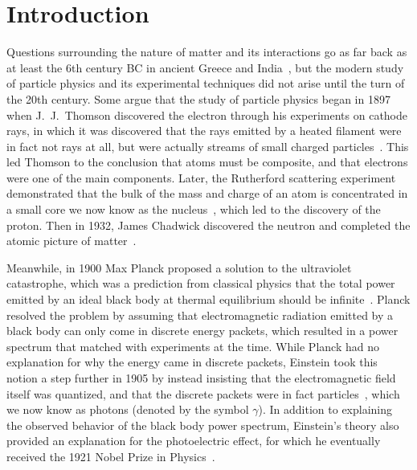 
\chapter{Introduction}
\label{chap:intro}

Questions surrounding the nature of matter and its interactions go as far back as at least the 6th century BC in ancient Greece and India~\cite{PhysNuclphys196p}, but the modern study of particle physics and its experimental techniques did not arise until the turn of the 20th century. %
Some argue that the study of particle physics began in 1897 when J.\ J.\ Thomson discovered the electron through his experiments on cathode rays, in which it was discovered that the rays emitted by a heated filament were in fact not rays at all, but were actually streams of small charged particles~\cite{doi:10.1080/14786449708621070}.
This led Thomson to the conclusion that atoms must be composite, and that electrons were one of the main components.
Later, the Rutherford scattering experiment demonstrated that the bulk of the mass and charge of an atom is concentrated in a small core we now know as the nucleus~\cite{BargerCollider}, which led to the discovery of the proton.
Then in 1932, James Chadwick discovered the neutron and completed the atomic picture of matter~\cite{weinberg2003discovery}.

Meanwhile, in 1900 Max Planck proposed a solution to the ultraviolet catastrophe, which was a prediction from classical physics that the total power emitted by an ideal black body at thermal equilibrium should be infinite~\cite{schroeder2013introduction}.
Planck resolved the problem by assuming that electromagnetic radiation emitted by a black body can only come in discrete energy packets, which resulted in a power spectrum that matched with experiments at the time.
While Planck had no explanation for why the energy came in discrete packets, Einstein took this notion a step further in 1905 by instead insisting that the electromagnetic field itself was quantized, and that the discrete packets were in fact particles~\cite{doi:10.1002/andp.19053220607}, which we now know as photons (denoted by the symbol $\gamma$).
In addition to explaining the observed behavior of the black body power spectrum, Einstein's theory also provided an explanation for the photoelectric effect, for which he eventually received the 1921 Nobel Prize in Physics~\cite{NobelPrize:1921-Physics}.


